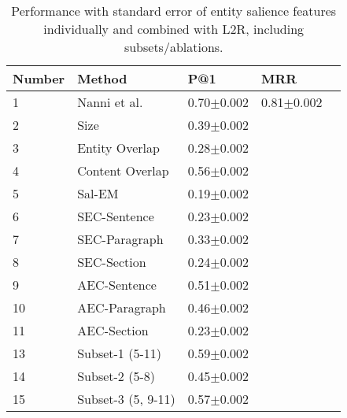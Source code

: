 \documentclass[sigconf,authordraft]{acmart}
\begin{document}
\begin{table}
    \caption{Performance with standard error of entity salience features individually and combined with L2R, including subsets/ablations.}
    \label{tab:Results-Entity Salience}
    \begin{tabular}{@{}lllll@{}}
        \toprule
        Number & 
        Method & 
        P@1 &
        MRR \\ 
        
        \midrule
        
        
      1 & 
      Nanni et al. &  
      0.70$\pm$0.002 &
      0.81$\pm$0.002\\
      
      2 & 
      Size &
      0.39$\pm$0.002 &
      \\
      
      3 & 
      Entity Overlap &     
      0.28$\pm$0.002 &
      \\ 
      
      4 & 
      Content Overlap &     
      0.56$\pm$0.002 &
      \\ 
      
      \midrule
      
      5 & 
      Sal-EM   &   
      0.19$\pm$0.002 &
      \\
       \midrule
      
      6 & 
      SEC-Sentence   &    
      0.23$\pm$0.002 &
      \\
      
      7 & 
      SEC-Paragraph  &    
      0.33$\pm$0.002 &
      \\
      
      8 & 
      SEC-Section  &    
      0.24$\pm$0.002 &
      \\
       \midrule
      
      9 & 
      AEC-Sentence   &    
      0.51$\pm$0.002 &
      \\
      
      10 & 
      AEC-Paragraph  &    
      0.46$\pm$0.002 &
      \\
      
      11 & 
      AEC-Section  &     
      0.23$\pm$0.002 &
      \\
    
       \midrule
       
      13 & 
      Subset-1 (5-11)&     
      0.59$\pm$0.002 &
      \\
      
      14 & 
      Subset-2 (5-8)&    
      0.45$\pm$0.002 &
      \\
      
      15 & 
      Subset-3 (5, 9-11)&     
      0.57$\pm$0.002 &
      \\
      
       \bottomrule
    \end{tabular}
\end{table}
\end{document}
